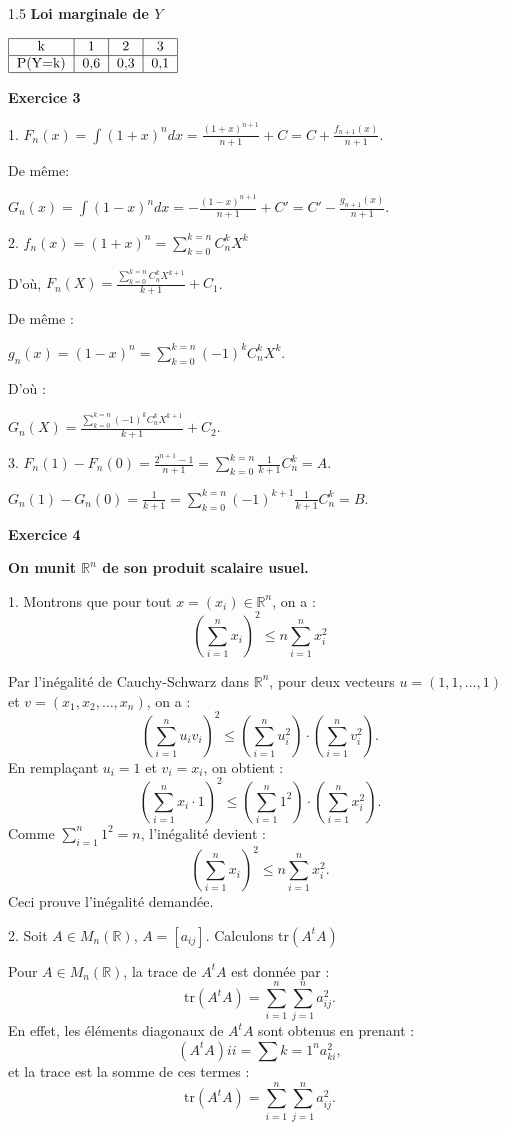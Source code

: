 \documentclass[12pt]{article}
\begin{document}
\begin{spacing}{1.5}
\textbf{Loi marginale de $Y$}

$
\begin{tabular}{|c|c|c|c|}
\hline 
k & 1 & 2 & 3 \\ 
\hline 
P(Y=k) & 0,6 & 0,3 & 0,1 \\ 
\hline 
\end{tabular} 
$

\medskip
\textbf{Exercice 3}

1. $F_n(x)=\int(1+x)^ndx=\frac{(1+x)^{n+1}}{n+1}+C=C+\frac{f_{n+1}(x)}{n+1}$.

De même: 

$G_n(x)=\int(1-x)^ndx=-\frac{(1-x)^{n+1}}{n+1}+C'=C'-\frac{g_{n+1}(x)}{n+1}$.

2. $f_n(x) = (1 + x)^n =\sum_{k=0}^{k=n}C_n^kX^k$

D'où, $F_n(X)=\frac{\sum_{k=0}^{k=n}C_n^kX^{k+1}}{k+1}+C_1$.

De même :

$g_n(x) = (1 - x)^n =\sum_{k=0}^{k=n}(-1)^kC_n^kX^k$.

D'où : 

$G_n(X)=\frac{\sum_{k=0}^{k=n}(-1)^{k}C_n^kX^{k+1}}{k+1}+C_2$.

3. $F_n(1)-F_n(0)=\frac{2^{n+1}-1}{n+1}=\sum_{k=0}^{k=n}\frac{1}{k+1} C_n^k=A$.

$G_n(1)-G_n(0)=\frac{1}{k+1}=\sum_{k=0}^{k=n}(-1)^{k+1} \frac{1}{k+1} C_n^k=B$.

\medskip\textbf{Exercice 4}

\textbf{On munit $\mathbb{R}^n$ de son produit scalaire usuel.}

1. Montrons que pour tout $x = (x_i) \in \mathbb{R}^n$, on a :
\[
\left( \sum_{i=1}^n x_i \right)^2 \leq n \sum_{i=1}^n x_i^2
\]

Par l'inégalité de Cauchy-Schwarz dans $\mathbb{R}^n$, pour deux vecteurs $u = (1, 1, \dots, 1)$ et $v = (x_1, x_2, \dots, x_n)$, on a :
\[
\left( \sum_{i=1}^n u_i v_i \right)^2 \leq \left( \sum_{i=1}^n u_i^2 \right) \cdot \left( \sum_{i=1}^n v_i^2 \right).
\]
En remplaçant $u_i = 1$ et $v_i = x_i$, on obtient :
\[
\left( \sum_{i=1}^n x_i \cdot 1 \right)^2 \leq \left( \sum_{i=1}^n 1^2 \right) \cdot \left( \sum_{i=1}^n x_i^2 \right).
\]
Comme $\sum_{i=1}^n 1^2 = n$, l'inégalité devient :
\[
\left( \sum_{i=1}^n x_i \right)^2 \leq n \sum_{i=1}^n x_i^2.
\]
Ceci prouve l'inégalité demandée.

2. Soit $A \in M_n(\mathbb{R})$, $A = [a_{ij}]$. Calculons $\text{tr}(A^t A)$ 

Pour $A \in M_n(\mathbb{R})$, la trace de $A^t A$ est donnée par :
\[
\text{tr}(A^t A) = \sum_{i=1}^n \sum_{j=1}^n a_{ij}^2.
\]
En effet, les éléments diagonaux de $A^t A$ sont obtenus en prenant :
\[
(A^t A){ii} = \sum{k=1}^n a_{ki}^2,
\]
et la trace est la somme de ces termes :
\[
\text{tr}(A^t A) = \sum_{i=1}^n \sum_{j=1}^n a_{ij}^2.
\]


\end{spacing}
\end{document}
